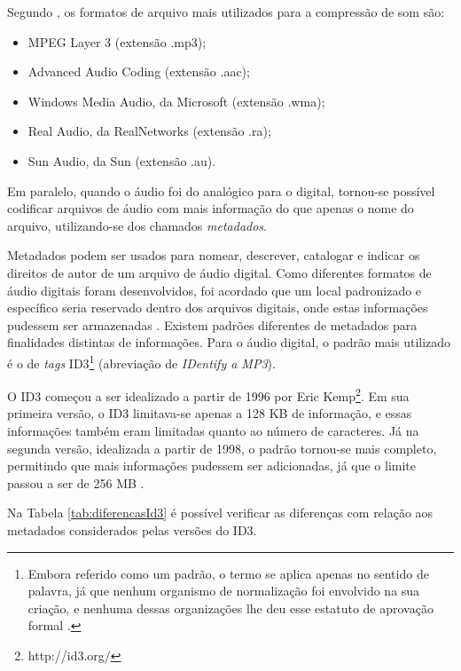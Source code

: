 Segundo , os formatos de arquivo mais utilizados para a compressão de som são:

\begin{itemize}
    \item MPEG Layer 3 (extensão .mp3);
    \item Advanced Audio Coding (extensão .aac);
    \item Windows Media Audio, da Microsoft (extensão .wma);
    \item Real Audio, da RealNetworks (extensão .ra);
    \item Sun Audio, da Sun (extensão .au).
\end{itemize}

Em paralelo, quando o áudio foi do analógico para o digital, tornou-se possível codificar arquivos de áudio com mais informação do que apenas o nome do arquivo, utilizando-se dos chamados \textit{metadados}.

Metadados podem ser usados para nomear, descrever, catalogar e indicar os direitos de autor de um arquivo de áudio digital. Como diferentes formatos de áudio digitais foram desenvolvidos, foi acordado que um local padronizado e específico seria reservado dentro dos arquivos digitais, onde estas informações pudessem ser armazenadas \cite{pachecolopes2014}. Existem padrões diferentes de metadados para finalidades distintas de informações. Para o áudio digital, o padrão mais utilizado é o de \textit{tags} ID3\footnote{Embora referido como um padrão, o termo se aplica apenas no sentido de palavra, já que nenhum organismo de normalização foi envolvido na sua criação, e nenhuma dessas organizações lhe deu esse estatuto de aprovação formal \cite{pachecolopes2014}.} (abreviação de \textit{IDentify a MP3}). 

O ID3 começou a ser idealizado a partir de 1996 por Eric Kemp\footnote{http://id3.org/}. Em sua primeira versão, o ID3 limitava-se apenas a 128 KB de informação, e essas informações também eram limitadas quanto ao número de caracteres. Já na segunda versão, idealizada a partir de 1998, o padrão tornou-se mais completo, permitindo que mais informações pudessem ser adicionadas, já que o limite passou a ser de 256 MB  \cite{ferreira2015}.

Na Tabela \ref{tab:diferencasId3} é possível verificar as diferenças com relação aos metadados considerados pelas versões do ID3.

